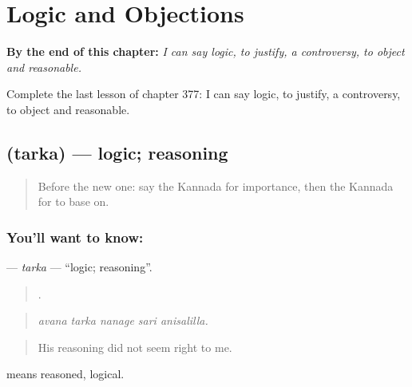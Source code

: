 
\chapter{Logic and Objections}
\label{ch:ka-logic-and-objections}

\begin{chapteropening}
\textbf{By the end of this chapter:} \emph{I can say logic, to justify, a controversy, to object and reasonable.}

Complete the last lesson of chapter 377: I can say logic, to justify, a controversy, to object and reasonable.
\end{chapteropening}

\section[\texorpdfstring{\kn{ತರ್ಕ} (tarka)}{ತರ್ಕ (tarka)}]{ (tarka) — logic; reasoning}

\label{lesson:KA-C377-tarka}



\begin{quote}
Before the new one: say the Kannada for importance, then the Kannada for to base on.
\end{quote}

\subsection*{You'll want to know: }
\textbf{} — \emph{tarka} — \textquotedblleft{}logic; reasoning\textquotedblright{}.

\begin{quote}
    .
\end{quote}

\begin{quote}
\emph{avana tarka nanage sari anisalilla.}
\end{quote}

\begin{quote}
His reasoning did not seem right to me.
\end{quote}

 means reasoned, logical.

